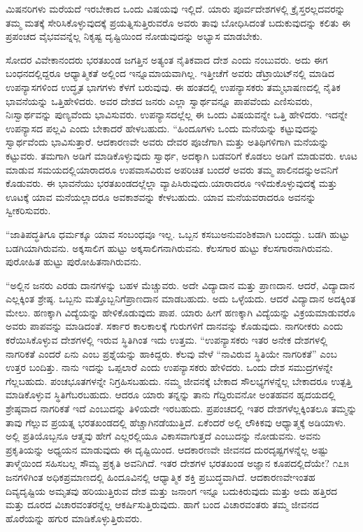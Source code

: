 ಮಿಷನರಿಗಳು ಮರೆಯದೆ ಇರಬೇಕಾದ ಒಂದು ವಿಷಯವು ಇಲ್ಲಿದೆ. ಯಾರು ಪೂರ್ವದೇಶಗಳಲ್ಲಿ ಕ್ರೈಸ್ತರಲ್ಲದವರನ್ನು ತಮ್ಮ ಮತಕ್ಕೆ ಸೇರಿಸಿಕೊಳ್ಳುವುದಕ್ಕೆ ಪ್ರಯತ್ನಿಸುತ್ತಿರುವರೊ ಅವರು ತಾವು ಬೋಧಿಸಿದಂತೆ ಬದುಕುವುದನ್ನು ಕಲಿತು ಈ ಪ್ರಪಂಚದ ವೈಭವವನ್ನೆಲ್ಲ ನಿಕೃಷ್ಟ ದೃಷ್ಟಿಯಿಂದ ನೋಡುವುದನ್ನು ಅಭ್ಯಾಸ ಮಾಡಬೇಕು.

ಸೋದರ ವಿವೇಕಾನಂದರು ಭರತಖಂಡ ಜಗತ್ತಿನ ಅತ್ಯಂತ ನೈತಿಕವಾದ ದೇಶ ಎಂದು ನಂಬುವರು. ಅದು ಈಗ ಬಂಧನದಲ್ಲಿದ್ದರೂ ಆಧ್ಯಾತ್ಮಿಕತೆ ಅಲ್ಲಿಂದ ಇನ್ನೂ\break ಮಾಯವಾಗಿಲ್ಲ. ಇತ್ತೀಚೆಗೆ ಅವರು ಡೆಟ್ರಾಯಿಟ್​ನಲ್ಲಿ ಮಾಡಿದ ಉಪನ್ಯಾಸಗಳಿಂದ ಉದ್ಧೃತ ಭಾಗಗಳು ಕೆಳಗೆ ಬರುವುವು. ಈ ಹಂತದಲ್ಲಿ ಉಪನ್ಯಾಸಕರು ತಮ್ಮ\break ಭಾಷಣದಲ್ಲಿ ನೈತಿಕ ಭಾವನೆಯನ್ನು ಒತ್ತಿಹೇಳಿದರು. ಅವರ ದೇಶದ ಜನರು ಎಲ್ಲಾ ಸ್ವಾರ್ಥವನ್ನೂ ಪಾಪವೆಂದು ಎಣಿಸುವರು, ನಿಃಸ್ವಾರ್ಥವನ್ನು ಪುಣ್ಯವೆಂದು ಭಾವಿಸುವರು. ಉಪನ್ಯಾಸದಲ್ಲೆಲ್ಲ ಈ ಒಂದು ವಿಷಯವನ್ನೇ ಒತ್ತಿ ಹೇಳಿದರು. ಇದನ್ನೇ ಉಪನ್ಯಾಸದ ಪಲ್ಲವಿ ಎಂದು ಬೇಕಾದರೆ ಹೇಳಬಹುದು. “ಹಿಂದೂಗಳು ಒಂದು ಮನೆಯನ್ನು ಕಟ್ಟುವುದನ್ನು ಸ್ವಾರ್ಥವೆಂದು ಭಾವಿಸುತ್ತಾರೆ. ಆದಕಾರಣವೇ ಅವರು ದೇವರ ಪೂಜೆಗಾಗಿ ಮತ್ತು ಅತಿಥಿಗಳಿಗಾಗಿ ಮನೆಯನ್ನು ಕಟ್ಟುವರು. ತಮಗಾಗಿ ಅಡಿಗೆ ಮಾಡಿಕೊಳ್ಳುವುದು ಸ್ವಾರ್ಥ, ಅದಕ್ಕಾಗಿ ಬಡವರಿಗೆ ಕೊಡಲು ಅಡಿಗೆ ಮಾಡುವರು. ಊಟ ಮಾಡುವ ಸಮಯದಲ್ಲಿ\break ಯಾರಾದರೂ ಉಪವಾಸವಿರುವ ಅಪರಿಚಿತ ಬಂದರೆ ಅವರು ತಮ್ಮ ಪಾಲಿನದನ್ನು\break ಅವನಿಗೆ ಕೊಡುವರು. ಈ ಭಾವನೆಯು ಭರತಖಂಡದಲ್ಲೆಲ್ಲಾ ವ್ಯಾಪಿಸಿರುವುದು.\break ಯಾರಾದರೂ ಇಳಿದುಕೊಳ್ಳುವುದಕ್ಕೆ ಮತ್ತು ಊಟಕ್ಕೆ ಯಾವ ಮನೆಯಲ್ಲಾದರೂ ಅವಕಾಶವನ್ನು ಕೇಳಬಹುದು. ಯಾವ ಮನೆಯವರಾದರೂ ಅವನನ್ನು ಸ್ವೀಕರಿಸುವರು.

“ಜಾತಿಪದ್ಧತಿಗೂ ಧರ್ಮಕ್ಕೂ ಯಾವ ಸಂಬಂಧವೂ ಇಲ್ಲ. ಒಬ್ಬನ ಕಸಬು\break ಅನುವಂಶಿಕವಾಗಿ ಬಂದದ್ದು. ಬಡಗಿ ಹುಟ್ಟು ಬಡಗಿಯಾಗಿರುವನು. ಅಕ್ಕಸಾಲಿಗ ಹುಟ್ಟು ಅಕ್ಕಸಾಲಿಗನಾಗಿರುವನು. ಕೆಲಸಗಾರ ಹುಟ್ಟು ಕೆಲಸಗಾರನಾಗಿರುವನು. ಪುರೋಹಿತ ಹುಟ್ಟು ಪುರೋಹಿತನಾಗಿರುವನು.

“ಅಲ್ಲಿನ ಜನರು ಎರಡು ದಾನಗಳನ್ನು ಬಹಳ ಮೆಚ್ಚುವರು. ಅದೇ ವಿದ್ಯಾದಾನ ಮತ್ತು ಪ್ರಾಣದಾನ. ಆದರೆ, ವಿದ್ಯಾದಾನ ಎಲ್ಲಕ್ಕಿಂತ ಶ್ರೇಷ್ಠ. ಒಬ್ಬನು ಮತ್ತೊಬ್ಬನಿಗೆ\break ಪ್ರಾಣದಾನ ಮಾಡಬಹುದು. ಅದು ಒಳ್ಳೆಯದು. ಆದರೆ ವಿದ್ಯಾದಾನ ಅದಕ್ಕಿಂತ ಮೇಲು. ಹಣಕ್ಕಾಗಿ ವಿದ್ಯೆಯನ್ನು ಹೇಳಿಕೊಡುವುದು ಪಾಪ. ಯಾರು ಹೀಗೆ ಹಣಕ್ಕಾಗಿ ವಿದ್ಯೆಯನ್ನು ವಿಕ್ರಯಮಾಡುವರೊ ಅವರು ಪಾಪವನ್ನು ಮಾಡಿದಂತೆ. ಸರ್ಕಾರ ಕಾಲಕಾಲಕ್ಕೆ ಗುರುಗಳಿಗೆ ದಾನವನ್ನು ಕೊಡುವುದು. ನಾಗರೀಕರು ಎಂದು ಕರೆಯಿಸಿಕೊಳ್ಳುವ ದೇಶಗಳಲ್ಲಿ ಇರುವ ಸ್ಥಿತಿಗಿಂತ ಇದು ಉತ್ತಮ. “ಉಪನ್ಯಾಸಕರು ಇತರ ಅನೇಕ ದೇಶಗಳಲ್ಲಿ ನಾಗರಿಕತೆ ಎಂದರೆ ಏನು ಎಂಬ ಪ್ರಶ್ನೆಯನ್ನು ಹಾಕಿದ್ದರು. ಕೆಲವು ವೇಳೆ “ನಾವಿರುವ ಸ್ಥಿತಿಯೇ ನಾಗರಿಕತೆ” ಎಂಬ ಉತ್ತರ ಬಂದಿತ್ತು. ನಾನು ಇದನ್ನು ಒಪ್ಪಲಾರೆ ಎಂದು ಉಪನ್ಯಾಸಕರು ಹೇಳಿದರು. ಒಂದು ದೇಶ ಸಮುದ್ರಗಳನ್ನೇ ಗೆಲ್ಲಬಹುದು. ಪಂಚಭೂತಗಳನ್ನೇ ನಿಗ್ರಹಿಸಬಹುದು. ನಮ್ಮ ಜೀವನಕ್ಕೆ ಬೇಕಾದ ಸೌಲಭ್ಯಗಳನ್ನೆಲ್ಲ ಬೇಕಾದರೂ ಉತ್ಪತ್ತಿ ಮಾಡಿಕೊಳ್ಳುವ ಸ್ಥಿತಿಗೆ\break ಬರಬಹುದು. ಆದರೂ ಯಾರು ತನ್ನನ್ನು ತಾನು ಗೆದ್ದಿರುವನೋ ಅಂತಹವನ ಹೃದಯದಲ್ಲಿ ಶ್ರೇಷ್ಠವಾದ ನಾಗರಿಕತೆ ಇದೆ ಎಂಬುದನ್ನು ತಿಳಿಯದೇ ಇರಬಹುದು. ಪ್ರಪಂಚದಲ್ಲಿ ಇತರ ದೇಶಗಳೆಲ್ಲಕ್ಕಿಂತಲೂ ತಮ್ಮನ್ನು ತಾವು ಗೆಲ್ಲುವ ಪ್ರಯತ್ನ ಭರತಖಂಡದಲ್ಲಿ ಹೆಚ್ಚಾಗಿ\break ನಡೆಯುತ್ತಿದೆ. ಏಕೆಂದರೆ ಅಲ್ಲಿ ಲೌಕಿಕವು ಆಧ್ಯಾತ್ಮಕ್ಕೆ ಅಡಿಯಾಳು. ಅಲ್ಲಿ ಪ್ರತಿಯೊಬ್ಬನೂ ಆತ್ಮವು ಹೇಗೆ ಎಲ್ಲರಲ್ಲಿಯೂ ವಿಕಾಸವಾಗುತ್ತದೆ ಎಂಬುದನ್ನು ನೋಡುವನು. ಅವನು ಪ್ರಕೃತಿಯನ್ನು ಅಧ್ಯಯನ ಮಾಡುವುದು ಈ ದೃಷ್ಟಿಯಿಂದ. ಆದಕಾರಣವೇ ಜೀವನದ ದುರದೃಷ್ಟಗಳನ್ನೆಲ್ಲ ಅಷ್ಟು ತಾಳ್ಮೆಯಿಂದ ಸಹಿಸಬಲ್ಲ ಸೌಮ್ಯ ಪ್ರಕೃತಿ ಅವನಿಗಿದೆ. ಇತರ ದೇಶಗಳ ಭರತಖಂಡ ಅಜ್ಞಾನ ಕೂಪದಲ್ಲಿದೆಯೇ? ೧೭೫ ಜನಗಳಿಗಿಂತ ಅಧಿಕ\break ಪ್ರಮಾಣದಲ್ಲಿ ಹಿಂದೂವಿನಲ್ಲಿ ಆಧ್ಯಾತ್ಮಿಕ ಶಕ್ತಿ ಪ್ರಬುದ್ಧವಾಗಿದೆ. ಆದಕಾರಣವೇ\break ಇಂತಹ ದಿವ್ಯದೃಷ್ಟಿಯ ಅಮೃತವು ಹರಿಯುತ್ತಿರುವ ದೇಶ ಮತ್ತು ಜನಾಂಗ ಇನ್ನೂ ಬದುಕಿರುವುದು ಮತ್ತು ಅದು ಹತ್ತಿರದ ಮತ್ತು ದೂರದ ವಿಚಾರವಂತರನ್ನೆಲ್ಲ ಆಕರ್ಷಿಸುತ್ತಿರುವುದು. ಹಾಗೆ ಬಂದ ವಿಚಾರವಂತರು ತಮ್ಮ ಜೀವನದ ಹೊರೆಯನ್ನು ಹಗುರ ಮಾಡಿಕೊಳ್ಳುತ್ತಿರುವರು.

